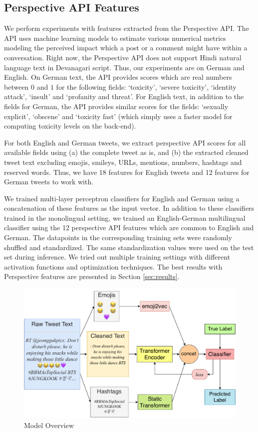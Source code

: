 \documentclass[
]{ceurart}
\begin{document}
\subsection{Perspective API Features}
We perform experiments with features extracted from the Perspective API. The API uses machine learning models to estimate various numerical metrics modeling the perceived impact which a post or a comment might have within a conversation. Right now, the Perspective API does not support Hindi natural language text in Devanagari script. Thus, our experiments are on German and English. On German text, the API provides scores which are real numbers between $0$ and $1$ for the following fields: `toxicity', `severe toxicity', `identity attack', `insult' and `profanity and threat'. For English text, in addition to the fields for German, the API provides similar scores for the fields: `sexually explicit', `obscene' and `toxicity fast' (which simply uses a faster model for computing toxicity levels on the back-end).

For both English and German tweets, we extract perspective API scores for all available fields using (a) the complete tweet as is, and (b) the extracted cleaned tweet text excluding emojis, smileys, URLs, mentions, numbers, hashtags and reserved words. Thus, we have 18 features for English tweets and 12 features for German tweets to work with.

We trained multi-layer perceptron classifiers for English and German using a concatenation of these features as the input vector. In addition to these classifiers trained in the monolingual setting, we trained an English-German multilingual classifier using the 12 perspective API features which are common to English and German. The datapoints in the corresponding training sets were randomly shuffled and standardized. The same standardization values were used on the test set during inference. We tried out multiple training settings with different activation functions and optimization techniques. The best results with Perspective features are presented in Section \ref{sec:results}.

\begin{figure}
    \centering
    \includegraphics[scale=0.6]{hate.pdf}
    \caption{Model Overview}
    \label{fig:pipeline}
\end{figure}
\end{document}
